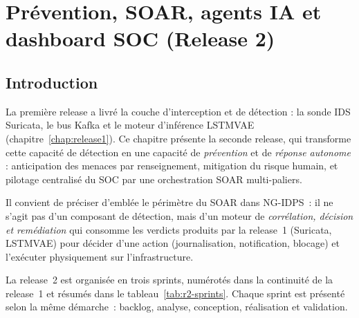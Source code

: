 
\chapter{Prévention, SOAR, agents IA et dashboard SOC (Release 2)}
\label{chap:release2}

\minitoc
\newpage

\section{Introduction}
La première release a livré la couche d'interception et de détection : la sonde \ac{IDS} Suricata, le bus \ac{Kafka} et le moteur d'inférence \ac{LSTMVAE} (chapitre~\ref{chap:release1}). Ce chapitre présente la seconde release, qui transforme cette capacité de détection en une capacité de \emph{prévention} et de \emph{réponse autonome} : anticipation des menaces par renseignement, mitigation du risque humain, et pilotage centralisé du \ac{SOC} par une orchestration \ac{SOAR} multi-paliers.

Il convient de préciser d'emblée le périmètre du \ac{SOAR} dans NG-IDPS~: il ne s'agit pas d'un composant de détection, mais d'un moteur de \emph{corrélation, décision et remédiation} qui consomme les verdicts produits par la release~1 (Suricata, \ac{LSTMVAE}) pour décider d'une action (journalisation, notification, blocage) et l'exécuter physiquement sur l'infrastructure.

La release~2 est organisée en trois sprints, numérotés dans la continuité de la release~1 et résumés dans le tableau~\ref{tab:r2-sprints}. Chaque sprint est présenté selon la même démarche~: backlog, analyse, conception, réalisation et validation.


